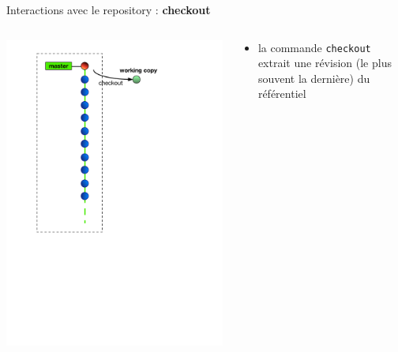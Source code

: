\begin{frame}[fragile]{%
\protect\hypertarget{interactions-avec-le-repository-checkout}{%
Interactions avec le repository : \textbf{checkout}}}

\begin{columns}[T]
\begin{column}{0.40\textwidth}
\includegraphics[height=1.5\textwidth]{images/checkout.pdf}
\end{column}

\begin{column}{0.60\textwidth}
\begin{itemize}
\tightlist
\item
  la commande \texttt{checkout} extrait une révision (le plus souvent la
  dernière) du référentiel
\end{itemize}
\end{column}
\end{columns}

\end{frame}

